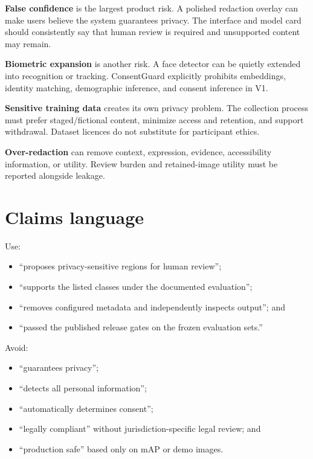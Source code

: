 \textbf{False confidence} is the largest product risk. A polished redaction overlay can make users believe the system guarantees privacy. The interface and model card should consistently say that human review is required and unsupported content may remain.

\textbf{Biometric expansion} is another risk. A face detector can be quietly extended into recognition or tracking. ConsentGuard explicitly prohibits embeddings, identity matching, demographic inference, and consent inference in V1.

\textbf{Sensitive training data} creates its own privacy problem. The collection process must prefer staged/fictional content, minimize access and retention, and support withdrawal. Dataset licences do not substitute for participant ethics.

\textbf{Over-redaction} can remove context, expression, evidence, accessibility information, or utility. Review burden and retained-image utility must be reported alongside leakage.

\section{Claims language}

Use:

\begin{itemize}[leftmargin=6mm]
  \item ``proposes privacy-sensitive regions for human review'';
  \item ``supports the listed classes under the documented evaluation'';
  \item ``removes configured metadata and independently inspects output''; and
  \item ``passed the published release gates on the frozen evaluation sets.''
\end{itemize}

Avoid:

\begin{itemize}[leftmargin=6mm]
  \item ``guarantees privacy'';
  \item ``detects all personal information'';
  \item ``automatically determines consent'';
  \item ``legally compliant'' without jurisdiction-specific legal review; and
  \item ``production safe'' based only on mAP or demo images.
\end{itemize}

